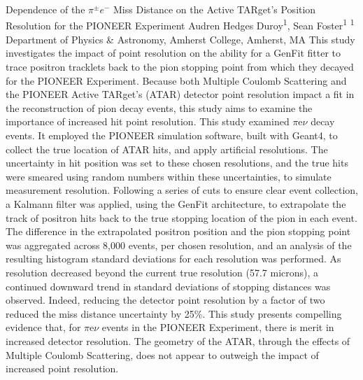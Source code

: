 \makeabstract
    {
    Dependence of the \ensuremath{\pi^\pm e^-} Miss Distance on the Active TARget{\textquoteright}s Position Resolution for the PIONEER Experiment
    }
    {
    Audren Hedges Duroy\textsuperscript{1}, Sean Foster\textsuperscript{1}
    }
    {
    \textsuperscript{1} Department of Physics \& Astronomy, Amherst College, Amherst, MA
    }
    {
    This study investigates the impact of point resolution on the ability for a GenFit fitter to trace positron tracklets back to the pion stopping point from which they decayed for the PIONEER Experiment. Because both Multiple Coulomb Scattering and the PIONEER Active TARget's (ATAR) detector point resolution impact a fit in the reconstruction of pion decay events, this study aims to examine the importance of increased hit point resolution.
    }
    {
    This study examined \ensuremath{\pi}{\textrightarrow}e\ensuremath{\nu} decay events. It employed the PIONEER simulation software, built with Geant4, to collect the true location of ATAR hits, and apply artificial resolutions. The uncertainty in hit position was set to these chosen resolutions, and the true hits were smeared using random numbers within these uncertainties, to simulate measurement resolution. Following a series of cuts to ensure clear event collection, a Kalmann filter was applied, using the GenFit architecture, to extrapolate the track of positron hits back to the true stopping location of the pion in each event. The difference in the extrapolated positron position and the pion stopping point was aggregated across 8,000 events, per chosen resolution, and an analysis of the resulting histogram standard deviations for each resolution was performed.
    }
    {
    As resolution decreased beyond the current true resolution (57.7 microns), a continued downward trend in standard deviations of stopping distances was observed. Indeed, reducing the detector point resolution by a factor of two reduced the miss distance uncertainty by 25\%.
    }
    {
    This study presents compelling evidence that, for \ensuremath{\pi}{\textrightarrow}e\ensuremath{\nu} events in the PIONEER Experiment, there is merit in increased detector resolution. The geometry of the ATAR, through the effects of Multiple Coulomb Scattering, does not appear to outweigh the impact of increased point resolution.
    }

    \newpage
    